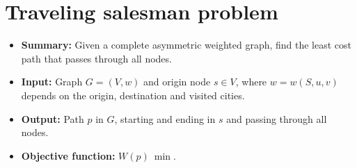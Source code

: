 \section{Traveling salesman problem} \label{algorithm-tsp}
\begin{itemize}
    \item \textbf{Summary:} Given a complete asymmetric weighted graph, find the least cost path that passes through all nodes. 
    \item \textbf{Input:} Graph $G=(V,w)$ and origin node $s \in V$, where $w=w(S, u, v)$ depends on the origin, destination and visited cities.
    \item \textbf{Output:} Path $p$ in $G$, starting and ending in $s$ and passing through all nodes.
    \item \textbf{Objective function:} $W(p)~\min$.
\end{itemize}


